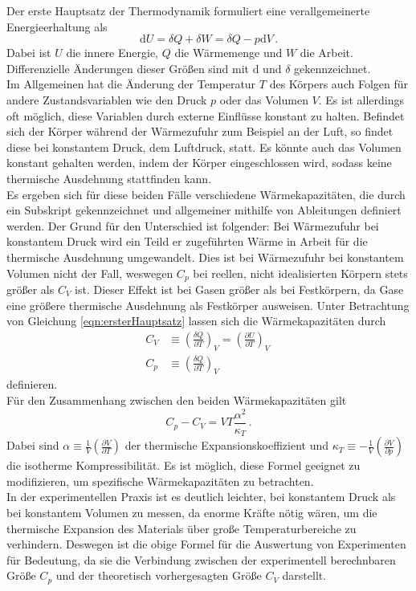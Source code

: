 Der erste Hauptsatz der Thermodynamik formuliert eine verallgemeinerte Energieerhaltung als
\begin{equation}
  \text{d}U = \delta Q + \delta W = \delta Q - p \text{d}V\,.
  \label{eqn:ersterHauptsatz}
\end{equation}
Dabei ist $U$ die innere Energie, $Q$ die Wärmemenge und $W$ die Arbeit. Differenzielle Änderungen dieser Größen sind mit $\text{d}$ und $\delta$ gekennzeichnet.\\
Im Allgemeinen hat die Änderung der Temperatur $T$ des Körpers auch Folgen für andere Zustandsvariablen wie den Druck $p$ oder das Volumen $V$. Es ist allerdings oft möglich, diese Variablen durch externe Einflüsse konstant zu halten. Befindet sich der Körper während der Wärmezufuhr zum Beispiel an der Luft, so findet diese bei konstantem Druck, dem Luftdruck, statt. Es könnte auch das Volumen konstant gehalten werden, indem der Körper eingeschlossen wird, sodass keine thermische Ausdehnung stattfinden kann.\\
Es ergeben sich für diese beiden Fälle verschiedene Wärmekapazitäten, die durch ein Subskript gekennzeichnet und allgemeiner mithilfe von Ableitungen definiert werden. Der Grund für den Unterschied ist folgender: Bei Wärmezufuhr bei konstantem Druck wird ein Teild er zugeführten Wärme in Arbeit für die thermische Ausdehnung umgewandelt. Dies ist bei Wärmezufuhr bei konstantem Volumen nicht der Fall, weswegen $C_p$ bei reellen, nicht idealisierten Körpern stets größer als $C_V$ ist. Dieser Effekt ist bei Gasen größer als bei Festkörpern, da Gase eine größere thermische Ausdehnung als Festkörper ausweisen.
Unter Betrachtung von Gleichung \ref{eqn:ersterHauptsatz} lassen sich die Wärmekapazitäten durch
\begin{align}
  C_V &\equiv \left(\frac{\delta Q}{\partial T}\right)_V = \left(\frac{\partial U}{\partial T}\right)_V\, \label{eqn:C_V}\\
  C_p &\equiv \left(\frac{\delta Q}{\partial T}\right)_V \label{eqn:C_p}
\end{align}
definieren.\\
Für den Zusammenhang zwischen den beiden Wärmekapazitäten gilt
\begin{equation}
  C_p - C_V = V T \frac{\alpha^2}{\kappa_T}\,.
  \label{eqn:CpminusCV}
\end{equation}
Dabei sind $\alpha \equiv \frac{1}{V}\left(\frac{\partial V}{\partial T}\right)$ der thermische Expansionskoeffizient und $\kappa_T \equiv - \frac{1}{V}\left(\frac{\partial V}{\partial p}\right)$ die isotherme Kompressibilität. Es ist möglich, diese Formel geeignet zu modifizieren, um spezifische Wärmekapazitäten zu betrachten.\\
In der experimentellen Praxis ist es deutlich leichter, bei konstantem Druck als bei konstantem Volumen zu messen, da enorme Kräfte nötig wären, um die thermische Expansion des Materials über große Temperaturbereiche zu verhindern. Deswegen ist die obige Formel für die Auswertung von Experimenten für Bedeutung, da sie die Verbindung zwischen der experimentell berechnbaren Größe $C_p$ und der theoretisch vorhergesagten Größe $C_V$ darstellt.

